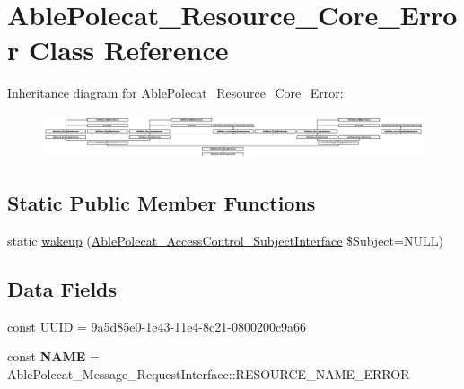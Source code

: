 \hypertarget{class_able_polecat___resource___core___error}{}\section{Able\+Polecat\+\_\+\+Resource\+\_\+\+Core\+\_\+\+Error Class Reference}
\label{class_able_polecat___resource___core___error}
Inheritance diagram for Able\+Polecat\+\_\+\+Resource\+\_\+\+Core\+\_\+\+Error\+:\begin{figure}[H]
\begin{center}
\leavevmode
\includegraphics[height=1.327913cm]{class_able_polecat___resource___core___error}
\end{center}
\end{figure}
\subsection*{Static Public Member Functions}
\begin{DoxyCompactItemize}
\item 
static \hyperlink{class_able_polecat___resource___core___error_a3f2135f6ad45f51d075657f6d20db2cd}{wakeup} (\hyperlink{interface_able_polecat___access_control___subject_interface}{Able\+Polecat\+\_\+\+Access\+Control\+\_\+\+Subject\+Interface} \$Subject=N\+U\+L\+L)
\end{DoxyCompactItemize}
\subsection*{Data Fields}
\begin{DoxyCompactItemize}
\item 
const \hyperlink{class_able_polecat___resource___core___error_a74b892c8c0b86bf9d04c5819898c51e7}{U\+U\+I\+D} = \textquotesingle{}9a5d85e0-\/1e43-\/11e4-\/8c21-\/0800200c9a66\textquotesingle{}
\item 
\hypertarget{class_able_polecat___resource___core___error_a244352f035b82b20b0efa506167fd862}{}const {\bfseries N\+A\+M\+E} = Able\+Polecat\+\_\+\+Message\+\_\+\+Request\+Interface\+::\+R\+E\+S\+O\+U\+R\+C\+E\+\_\+\+N\+A\+M\+E\+\_\+\+E\+R\+R\+O\+R\label{class_able_polecat___resource___core___error_a244352f035b82b20b0efa506167fd862}

\end{DoxyCompactItemize}
